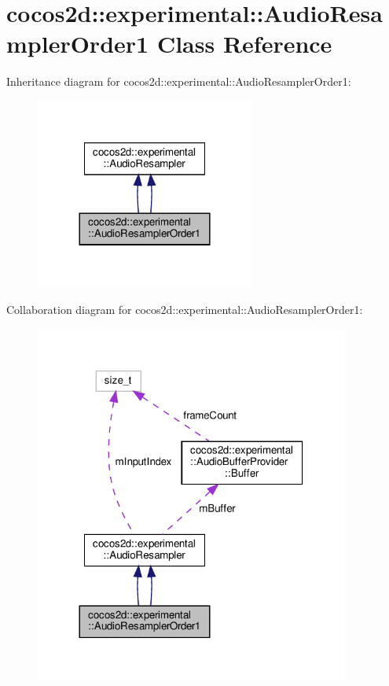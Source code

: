 \hypertarget{classcocos2d_1_1experimental_1_1AudioResamplerOrder1}{}\section{cocos2d\+:\+:experimental\+:\+:Audio\+Resampler\+Order1 Class Reference}
\label{classcocos2d_1_1experimental_1_1AudioResamplerOrder1}


Inheritance diagram for cocos2d\+:\+:experimental\+:\+:Audio\+Resampler\+Order1\+:
\nopagebreak
\begin{figure}[H]
\begin{center}
\leavevmode
\includegraphics[width=204pt]{classcocos2d_1_1experimental_1_1AudioResamplerOrder1__inherit__graph}
\end{center}
\end{figure}


Collaboration diagram for cocos2d\+:\+:experimental\+:\+:Audio\+Resampler\+Order1\+:
\nopagebreak
\begin{figure}[H]
\begin{center}
\leavevmode
\includegraphics[width=293pt]{classcocos2d_1_1experimental_1_1AudioResamplerOrder1__coll__graph}
\end{center}
\end{figure}
